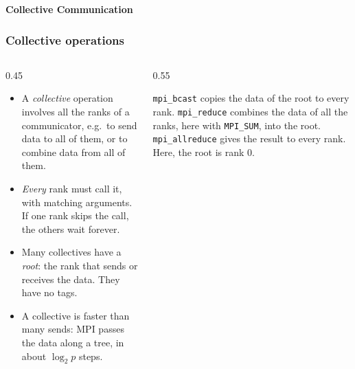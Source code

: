 \begin{frame}
  \centering
  \Huge \textbf{Collective Communication}
\end{frame}


\begin{frame}
  \frametitle{Collective operations}
  \begin{columns}[T]
    \begin{column}{0.45\textwidth}
      \begin{itemize}
        \item A \emph{collective} operation involves all the ranks of a communicator, e.g.\ to send data to all of them, or to combine data from all of them.
        \item \emph{Every} rank must call it, with matching arguments. If one rank skips the call, the others wait forever.
        \item Many collectives have a \emph{root}: the rank that sends or receives the data. They have no tags.
        \item A collective is faster than many sends: MPI passes the data along a tree, in about $\log_2 p$ steps.
      \end{itemize}
    \end{column}

    \begin{column}{0.55\textwidth}
      \centering

      \vspace*{3mm}
      \footnotesize
      \raggedright
      \texttt{mpi\_bcast} copies the data of the root to every rank. \texttt{mpi\_reduce} combines the data of all the ranks, here with \texttt{MPI\_SUM}, into the root. \texttt{mpi\_allreduce} gives the result to every rank. Here, the root is rank 0.
    \end{column}
  \end{columns}
\end{frame}


